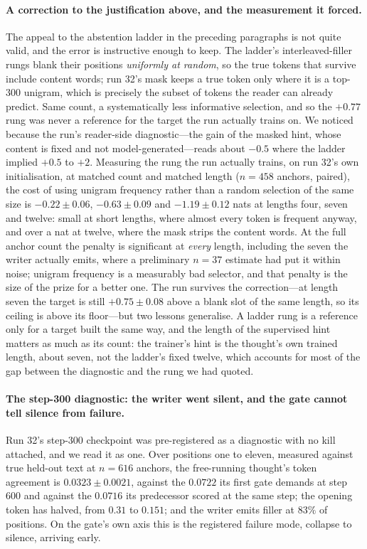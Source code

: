 \documentclass{article} %
\begin{document}
\paragraph{A correction to the justification above, and the measurement it forced.} The appeal to the
abstention ladder in the preceding paragraphs is not quite valid, and the error is instructive enough to
keep. The ladder's interleaved-filler rungs blank their positions \emph{uniformly at random}, so the
true tokens that survive include content words; run 32's mask keeps a true token only where it is a
top-$300$ unigram, which is precisely the subset of tokens the reader can already predict. Same count,
a systematically less informative selection, and so the $+0.77$ rung was never a reference for the
target the run actually trains on. We noticed because the run's reader-side diagnostic---the gain of the
masked hint, whose content is fixed and not model-generated---reads about $-0.5$ where the ladder implied
$+0.5$ to $+2$. Measuring the rung the run actually trains, on run 32's own initialisation, at matched
count and matched length ($n=458$ anchors, paired), the cost of
using unigram frequency rather than a random selection of the same size is $-0.22 \pm 0.06$,
$-0.63 \pm 0.09$ and $-1.19 \pm 0.12$
nats at lengths four, seven and twelve: small at short lengths, where almost every token is frequent
anyway, and over a nat at twelve, where the mask strips the content words. At the full anchor count the
penalty is significant at \emph{every} length, including the seven the writer actually emits, where a
preliminary $n=37$ estimate had put it within noise; unigram frequency is a measurably bad selector, and
that penalty is the size of the prize for a better one. The run survives the
correction---at length seven the target is still
$+0.75 \pm 0.08$ above a blank slot of the same length, so its ceiling is above its floor---but two
lessons generalise. A ladder rung is a reference only for a target built the same way, and the length of
the supervised hint matters as much as its count: the trainer's hint is the thought's own trained length,
about seven, not the ladder's fixed twelve, which accounts for most of the gap between the diagnostic and
the rung we had quoted.

\paragraph{The step-300 diagnostic: the writer went silent, and the gate cannot tell silence from
failure.} Run 32's step-$300$ checkpoint was pre-registered as a diagnostic with no kill attached, and
we read it as one. Over positions one to eleven, measured against true held-out text at $n=616$ anchors,
the free-running thought's token agreement is $0.0323 \pm 0.0021$, against the $0.0722$ its first gate
demands at step $600$ and against the $0.0716$ its predecessor scored at the same step; the opening
token has halved, from $0.31$ to $0.151$; and the writer emits filler at $83\%$ of positions. On the
gate's own axis this is the registered failure mode, collapse to silence, arriving early.
\end{document}
